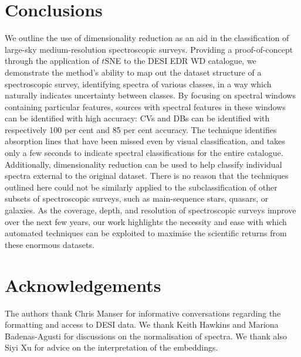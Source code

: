\documentclass[fleqn,usenatbib]{mnras}
\begin{document}
\section{Conclusions}
\label{sec:conclusions}

We outline the use of dimensionality reduction as an aid in the classification of large-sky medium-resolution spectroscopic surveys.
Providing a proof-of-concept through the application of $t$SNE to the DESI EDR WD catalogue, we demonstrate the method's ability to map out the dataset structure of a spectroscopic survey, identifying spectra of various classes, in a way which naturally indicates uncertainty between classes.
By focusing on spectral windows containing particular features, sources with spectral features in these windows can be identified with high accuracy: CVs and DBs can be identified with respectively 100 per cent and 85 per cent accuracy.
The technique identifies absorption lines that have been missed even by visual classification, and takes only a few seconds to indicate spectral classifications for the entire catalogue.
Additionally, dimensionality reduction can be used to help classify individual spectra external to the original dataset.
There is no reason that the techniques outlined here could not be similarly applied to the subclassification of other subsets of spectroscopic surveys, such as main-sequence stars, quasars, or galaxies.
As the coverage, depth, and resolution of spectroscopic surveys improve over the next few years, our work highlights the necessity and ease with which automated techniques can be exploited to maximise the scientific returns from these enormous datasets.

\section*{Acknowledgements}

The authors thank Chris Manser for informative conversations regarding the formatting and access to DESI data.
We thank Keith Hawkins and Mariona Badenas-Agusti for discussions on the normalisation of spectra.
We thank also Siyi Xu for advice on the interpretation of the embeddings.
\end{document}

